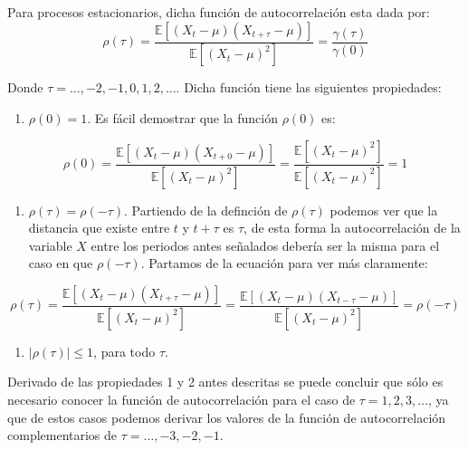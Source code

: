 \documentclass[
]{book}
\providecommand{\tightlist}{%
  \setlength{\itemsep}{0pt}\setlength{\parskip}{0pt}}
\begin{document}
Para procesos estacionarios, dicha función de autocorrelación esta dada por:
\begin{equation}
    \rho(\tau) = \frac{\mathbb{E}[(X_t - \mu)(X_{t+\tau} - \mu)]}{\mathbb{E}[(X_t - \mu)^2]} = \frac{\gamma(\tau)}{\gamma(0)}
    \label{eq:em5}
\end{equation}

Donde \(\tau = \ldots, -2, -1, 0, 1, 2, \ldots\). Dicha función tiene las siguientes propiedades:

\begin{enumerate}
\def\labelenumi{\arabic{enumi}.}
\tightlist
\item
  \(\rho(0) = 1\). Es fácil demostrar que la función \(\rho(0)\) es:
\end{enumerate}

\begin{equation}
    \rho(0) = \frac{\mathbb{E}[(X_t - \mu)(X_{t + 0} - \mu)]}{\mathbb{E}[(X_t - \mu)^2]} = \frac{\mathbb{E}[(X_t - \mu)^2]}{\mathbb{E}[(X_t - \mu)^2]} = 1
\end{equation}

\begin{enumerate}
\def\labelenumi{\arabic{enumi}.}
\setcounter{enumi}{1}
\tightlist
\item
  \(\rho(\tau) = \rho(-\tau)\). Partiendo de la definción de \(\rho(\tau)\) podemos ver que la distancia que existe entre \(t\) y \(t + \tau\) es \(\tau\), de esta forma la autocorrelación de la variable \(X\) entre los periodos antes señalados debería ser la misma para el caso en que \(\rho(-\tau)\). Partamos de la ecuación para ver más claramente:
\end{enumerate}

\begin{equation}
    \rho(\tau) = \frac{\mathbb{E}[(X_t - \mu)(X_{t + \tau} - \mu)]}{\mathbb{E}[(X_t - \mu)^2]} = \frac{\mathbb{E}[(X_t - \mu)(X_{t - \tau} - \mu)]}{\mathbb{E}[(X_t - \mu)^2]} = \rho(-\tau)
\end{equation}

\begin{enumerate}
\def\labelenumi{\arabic{enumi}.}
\setcounter{enumi}{2}
\tightlist
\item
  \(\lvert\rho(\tau)\lvert \leq 1\), para todo \(\tau\).
\end{enumerate}

Derivado de las propiedades 1 y 2 antes descritas se puede concluir que sólo es necesario conocer la función de autocorrelación para el caso de \(\tau = 1, 2, 3, \ldots\), ya que de estos casos podemos derivar los valores de la función de autocorrelación complementarios de \(\tau = \ldots, -3, -2, -1\).
\end{document}
